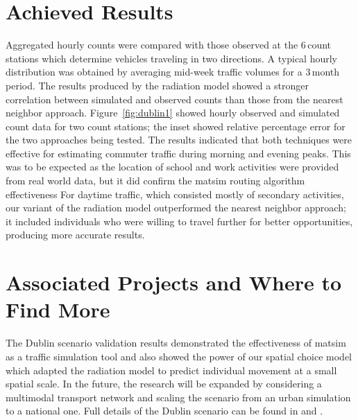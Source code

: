 \section{Achieved Results}
Aggregated hourly counts were compared with those observed at the 6\,count stations which determine vehicles traveling in two directions. A typical hourly distribution was obtained by averaging mid-week traffic volumes for a 3\,month period. The results produced by the radiation model showed a stronger correlation between simulated and observed counts than those from the nearest neighbor approach. Figure~\ref{fig:dublin1} showed hourly observed and simulated count data for two count stations; the inset showed relative percentage error for the two approaches being tested. The results indicated that both techniques were effective for estimating commuter traffic during morning and evening peaks. This was to be expected as the location of school and work activities were provided from real world data, but it did confirm the \gls{matsim} routing algorithm effectiveness For daytime traffic, which consisted mostly of secondary activities, our variant of the radiation model outperformed the nearest neighbor approach; it included individuals who were willing to travel further for better opportunities, producing more accurate results.

\section{Associated Projects and Where to Find More}
The Dublin scenario validation results demonstrated the effectiveness of \gls{matsim} as a traffic simulation tool and also showed the power of our spatial choice model which adapted the radiation model to predict individual movement at a small spatial scale. In the future, the research will be expanded by considering a \gls{multimodal} transport network and scaling the scenario from an urban simulation to a national one. Full details of the Dublin scenario can be found in \citet[][]{McArdleEtAl_IWUC_2012} and \citet[][]{McArdleEtAl_ACMTIS_2014}.

